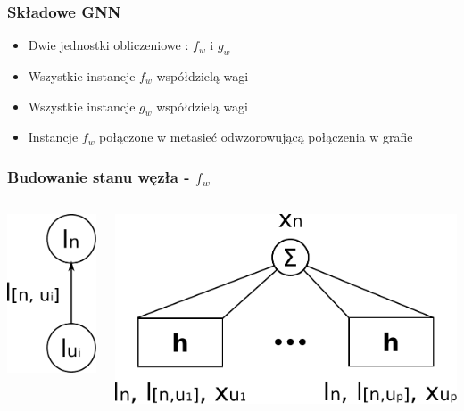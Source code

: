 \documentclass{beamer}
\begin{document}
\begin{frame}
\frametitle{Składowe GNN}
\begin{itemize}
	\item Dwie jednostki obliczeniowe : $f_w$ i $g_w$
	\item Wszystkie instancje $f_w$ współdzielą wagi
	\item Wszystkie instancje $g_w$ współdzielą wagi
	\item Instancje $f_w$ połączone w metasieć odwzorowującą połączenia w grafie
\end{itemize}
\end{frame}

\begin{frame}
\frametitle{Budowanie stanu węzła - $f_w$}
\begin{columns}
	\begin{column}{0.2\textwidth}
		\begin{center}
			\includegraphics[scale=0.4]{img/connection}
		\end{center}
	\end{column}
	\begin{column}{0.8\textwidth}
		\begin{center}
			\includegraphics[scale=0.4]{img/f}

\end{center}
\end{column}
\end{columns}
\end{frame}
\end{document}
